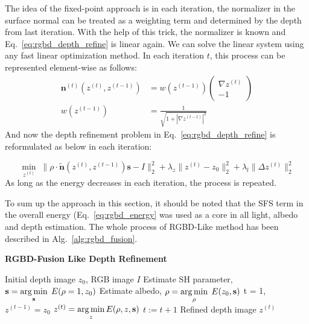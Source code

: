 The idea of the fixed-point approach is in each iteration, the normalizer in the surface normal can be treated as a weighting term and determined by the depth from last iteration.
With the help of this trick, the normalizer is known and Eq.~\ref{eq:rgbd_depth_refine} is linear again.
We can solve the linear system using any fast linear optimization method.
In each iteration $t$, this process can be represented element-wise as follows:
\begin{equation}
	\begin{split}
		\mathbf{n}^{(t)}(z^{(t)}, z^{(t-1)}) &= w(z^{(t-1)})
		\begin{pmatrix} 
			 \nabla z^{(t)}\\ 
			 -1
	         \end{pmatrix}\\
	         w(z^{(t-1)}) &=  \frac{1}{\sqrt{1 + |\nabla z^{(t-1)}|^2}}
	\end{split}
\end{equation}
And now the depth refinement problem in Eq.~\ref{eq:rgbd_depth_refine} is reformulated as below in each iteration:

\begin{equation}\label{eq:rgbd_depth_refine2}
	\min_{z^{(t)}} \; \lVert \rho \cdot \tilde{\mathbf{n}}(z^{(t)}, z^{(t-1)}) \mathbf{s} -I\rVert^2_2 + \lambda_z \lVert z^{(t)} - z_0\rVert^2_2 + \lambda_l \lVert \Delta z^{(t)} \rVert^2_2
\end{equation}
As long as the energy decreases in each iteration, the process is repeated.

To sum up the approach in this section, it should be noted that the SFS term in the overall energy (Eq.~\ref{eq:rgbd_energy} was used as a core in all light, albedo and depth estimation.
The whole process of RGBD-Like method has been described in Alg.~\ref{alg:rgbd_fusion}. 



\begin{algorithm}[!htbp]
	\begin{algorithmic}[1]
  		\caption{\textbf{RGBD-Fusion Like Depth Refinement}}
		\label{alg:rgbd_fusion}
		 \renewcommand{\algorithmicrequire}{\textbf{Input:}}
		 \renewcommand{\algorithmicensure}{\textbf{Output:}}
		 \REQUIRE Initial depth image $z_0$, RGB image $I$
		 \vspace{1.8mm}
		 \STATE Estimate SH parameter, $\mathbf{s} = \operatorname*{arg\,min} \limits_{\mathbf{s}} \; E(\rho = 1, z_0)$ 
		 \STATE Estimate albedo, $\rho = \operatorname*{arg\,min} \limits_{\rho} \; E(z_0, \mathbf{s})$ 
		 \STATE t = 1, $z^{(t-1)} = z_0$
		 \vspace{1.8mm}
		   \vspace{1.8mm}
			  \STATE $z^{(t)} = \operatorname*{arg\,min} \limits_{z} E(\rho, z, \mathbf{s})$ 
		          \STATE $t := t + 1$
		 \vspace{1.8mm}
		  \ENDWHILE
		  \ENSURE  Refined depth image $z^{(t)}$
	\end{algorithmic}
\end{algorithm}


